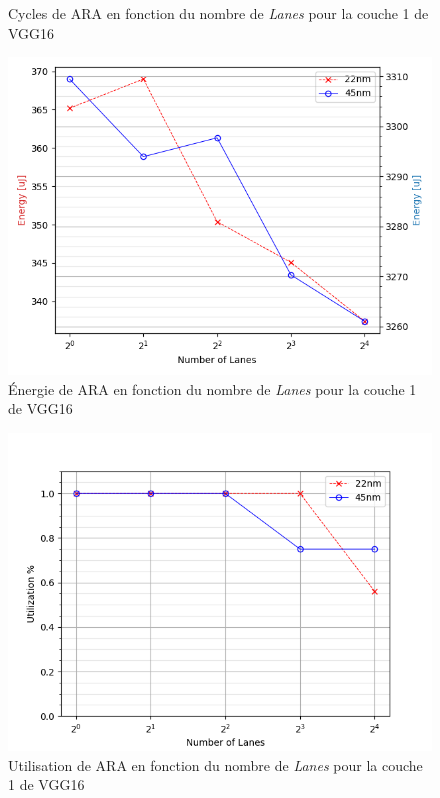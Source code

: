\documentclass[11pt,letterpaper]{article}
\begin{document}
\begin{multicols}{2}
\begin{figure}[H]
        \caption{Cycles de ARA en fonction du nombre de \textit{Lanes} pour la couche 1 de VGG16}
        \label{fig:cycles}
    \end{figure}
    \begin{figure}[H]
        \centering
        \includegraphics[width=\linewidth]{energy.png}
        \caption{Énergie de ARA en fonction du nombre de \textit{Lanes} pour la couche 1 de VGG16}
        \label{fig:energy}
    \end{figure}
    \begin{figure}[H]
        \centering
        \includegraphics[width=\linewidth]{utilization.png}
        \caption{Utilisation de ARA en fonction du nombre de \textit{Lanes} pour la couche 1 de VGG16}
        \label{fig:utilization}
    \end{figure}

    \end{multicols}
\end{document}
